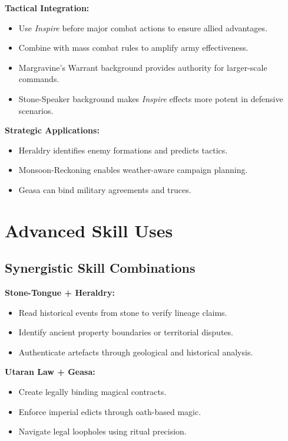 \textbf{Tactical Integration:}
\begin{itemize}
    \item Use \emph{Inspire} before major combat actions to ensure allied advantages.
    \item Combine with mass combat rules to amplify army effectiveness.
    \item Margravine's Warrant background provides authority for larger-scale commands.
    \item Stone-Speaker background makes \emph{Inspire} effects more potent in defensive scenarios.
\end{itemize}

\textbf{Strategic Applications:}
\begin{itemize}
    \item Heraldry identifies enemy formations and predicts tactics.
    \item Monsoon-Reckoning enables weather-aware campaign planning.
    \item Geasa can bind military agreements and truces.
\end{itemize}

\section{Advanced Skill Uses}\label{sec:advanced_skills}

\subsection{Synergistic Skill Combinations}\label{subsec:skill_synergies}

\textbf{Stone-Tongue + Heraldry:}
\begin{itemize}
    \item Read historical events from stone to verify lineage claims.
    \item Identify ancient property boundaries or territorial disputes.
    \item Authenticate artefacts through geological and historical analysis.
\end{itemize}

\textbf{Utaran Law + Geasa:}
\begin{itemize}
    \item Create legally binding magical contracts.
    \item Enforce imperial edicts through oath-based magic.
    \item Navigate legal loopholes using ritual precision.
\end{itemize}

